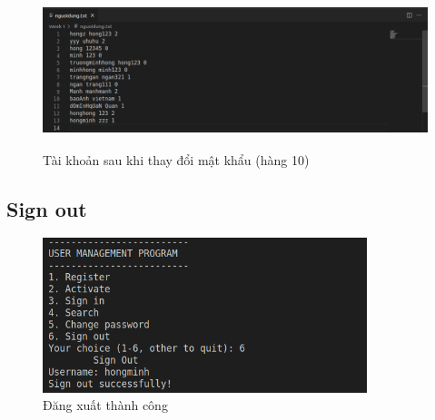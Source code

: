 \documentclass[12pt]{article}
\begin{document}
\begin{figure}[!htb]
    \begin{center}
        \includegraphics[width=0.8\linewidth, height=4.5cm]{Img/5sucfile.png}
    \end{center}
    \caption{Tài khoản sau khi thay đổi mật khẩu (hàng 10)}
    \label{fig:5_sucfile}
\end{figure}

\newpage
\subsection{Sign out}
\begin{figure}[!htb]
    \begin{center}
        \includegraphics[width=0.8\linewidth, height=4.5cm]{Img/6Sign.png}
    \end{center}
    \caption{Đăng xuất thành công}
    \label{fig:6_sucfile}
\end{figure}
\end{document}
